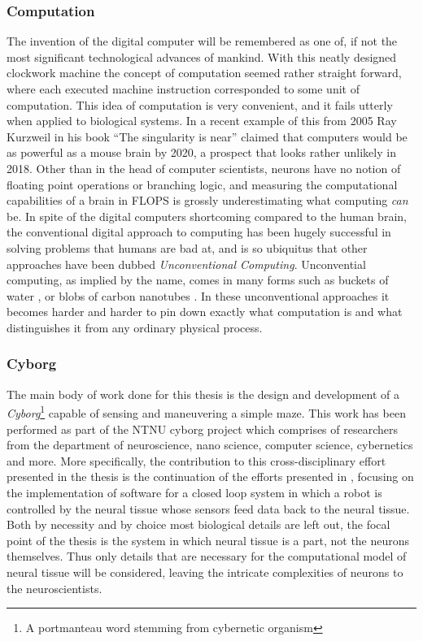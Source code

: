 \subsubsection{Computation}
The invention of the digital computer will be remembered as one of, if not the
most significant technological advances of mankind.
%
With this neatly designed clockwork machine the concept of computation seemed
rather straight forward, where each executed machine instruction corresponded to
some unit of computation.
%
This idea of computation is very convenient, and it fails utterly when
applied to biological systems.
In a recent example of this from 2005 \cite{kurzweil2005the}
Ray Kurzweil in his book ``The singularity is near''
claimed that computers would be as powerful as a
mouse brain by 2020, a prospect that looks rather unlikely in 2018.
Other than in the head of computer scientists, neurons have no notion of
floating point operations or branching logic, and measuring the computational
capabilities of a brain in FLOPS is grossly underestimating what computing
\emph{can} be.
%
In spite of the digital computers shortcoming compared to the human brain, the
conventional digital approach to computing has been hugely successful in solving
problems that humans are bad at, and is so ubiquitus that other approaches
have been dubbed \emph{Unconventional Computing}.
%
Unconvential computing, as implied by the name, comes in many forms such as
buckets of water \cite{fernando_pattern_2003}, or blobs of carbon nanotubes
\cite{carbon_nanotube_square}. 
%
In these unconventional approaches it becomes harder and harder to pin down
exactly what computation is and what distinguishes it from any ordinary physical
process.
%
\subsubsection{Cyborg}
The main body of work done for this thesis is the design and development of a
\emph{Cyborg}\footnote{A portmanteau word stemming from cybernetic organism}
capable of sensing and maneuvering a simple maze.
This work has been performed as part of the NTNU cyborg project \cite{ntnu_cyborg}
which comprises of researchers from the department of neuroscience, nano
science, computer science, cybernetics and more.
More specifically, the contribution to this cross-disciplinary effort presented
in the thesis is the continuation of the efforts presented in \cite{TMAC},
focusing on the implementation of software for a closed loop system in which a
robot is controlled by the neural tissue whose sensors feed data back to the neural
tissue.
Both by necessity and by choice most biological details are left out, the focal
point of the thesis is the system in which neural tissue is a part, not the
neurons themselves.
Thus only details that are necessary for the computational model of neural
tissue will be considered, leaving the intricate complexities of neurons to the
neuroscientists.
\cleardoublepage


